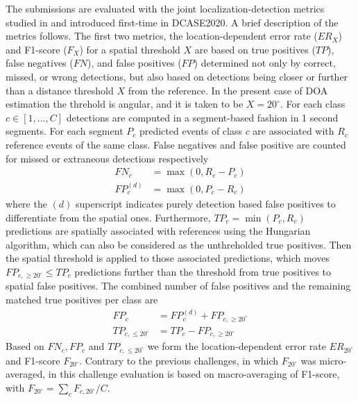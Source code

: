 \documentclass{article}
\begin{document}
\begin{sloppy}
The submissions are evaluated with the joint localization-detection metrics studied in \cite{mesaros2019joint, politis2020overview} and introduced first-time in DCASE2020. A brief description of the metrics follows. The first two metrics, the location-dependent error rate ($ER_X$) and F1-score ($F_X$) for a spatial threshold $X$ are based on true positives ($TP$), false negatives ($FN$), and false positives ($FP$) determined not only by correct, missed, or wrong detections, but also based on detections being closer or further than a distance threshold $X$ from the reference. In the present case of DOA estimation the threhold is angular, and it is taken to be $X = 20^\circ$. For each class $c\in[1,...,C]$ detections are computed in a segment-based fashion \cite{mesaros2016metrics} in 1 second segments. For each segment $P_c$ predicted events of class $c$ are associated with $R_c$ reference events of the same class. False negatives and false positive are counted for missed or extraneous detections respectively
\begin{align}
    FN_c &= \max(0, R_c-P_c)\\
    FP_c^{(d)} &= \max(0, P_c-R_c)
\end{align}
where the $(d)$ superscript indicates purely detection based false positives to differentiate from the spatial ones. Furthermore, 
$TP_c=\min(P_c,R_c)$ predictions are spatially associated with references using the Hungarian algorithm, which can also be considered as the unthreholded true positives. Then the spatial threshold is applied to those associated predictions, which moves $FP_{c,\geq 20^\circ} \leq TP_c$ predictions further than the threshold from true positives to spatial false positives. The combined number of false positives and the remaining matched true positives per class are
\begin{align}
    FP_c &= FP_c^{(d)} + FP_{c,\geq 20^\circ}\\
    TP_{c,\leq 20^\circ} &= TP_c - FP_{c,\geq 20^\circ}
\end{align}
Based on $FN_c, FP_c$ and $TP_{c,\leq 20^\circ}$ we form the location-dependent error rate $ER_{20^\circ}$ and F1-score $F_{20^\circ}$. Contrary to the previous challenges, in which $F_{20^\circ}$ was micro-averaged, in this challenge evaluation is based on macro-averaging of F1-score, with $F_{20^\circ} = \sum_c F_{c,20^\circ}/C$.


\end{sloppy}
\end{document}
